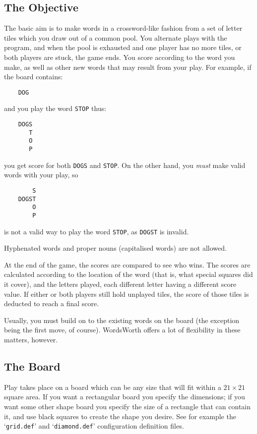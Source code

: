 \subsection{The Objective}

The basic aim is to make words in a crossword-like fashion from a
set of letter tiles which you draw out of a common pool. You 
alternate plays with the program, and when the pool is exhausted 
and one player has no more tiles, or both players are stuck, the
game ends. You score according to the word you make, as well as 
other new words that may result from your play. For example, if
the board contains:

\begin{verbatim}
    DOG
\end{verbatim}

and you play the word {\tt STOP} thus:

\begin{verbatim}
    DOGS
       T
       O
       P
\end{verbatim}

you get score for both {\tt DOGS} and {\tt STOP}. On the other hand, you 
{\em must} make valid words with your play, so

\begin{verbatim}
        S
    DOGST
        O
        P
\end{verbatim}

is not a valid way to play the word {\tt STOP}, as {\tt DOGST} is invalid.

Hyphenated words and proper nouns (capitalised words) are not
allowed.

At the end of the game, the scores are compared to see who wins.
The scores are calculated according to the location of the word
(that is, what special squares did it cover), and the letters
played, each different letter having a different score value.
If either or both players still hold unplayed tiles, the score 
of those tiles is deducted to reach a final score.

Usually, you must build on to the existing words on the board
(the exception being the first move, of course). WordsWorth
 offers a lot of flexibility in these matters, however.


\subsection{The Board}

Play takes place on a board which can be any size that will fit
within a $21\times21$ square area. If you want a rectangular board you
specify the dimensions; if you want some other shape board you 
specify the size of a rectangle that can contain it, and use
black squares to create the shape you desire. See for example 
the `{\tt grid.def}' and `{\tt diamond.def}' configuration definition files.

